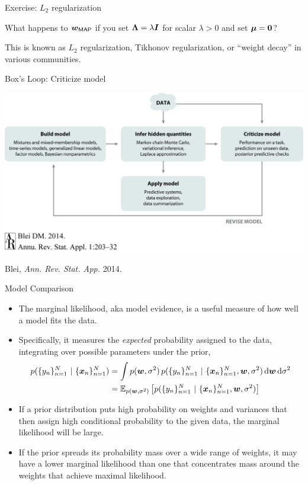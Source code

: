\documentclass[aspectratio=169]{beamer}
\begin{document}
\begin{frame}[t]{Exercise: $L_2$ regularization}

What happens to $\boldsymbol{w}_{\mathsf{MAP}}$ if you set $\boldsymbol{\Lambda} = \lambda \boldsymbol{I}$ for scalar $\lambda > 0$ and set $\boldsymbol{\mu} = \boldsymbol{0}$? 

This is known as $L_2$ regularization, Tikhonov regularization, or ``weight decay'' in various communities.

\end{frame}

\begin{frame}{Box's Loop: Criticize model}
\begin{center}
\includegraphics[width=.85\linewidth]{figures/lap1/boxsloop.jpeg}\\
\end{center} 
\begin{flushright}
{\footnotesize Blei, \textit{Ann. Rev. Stat. App.} 2014.}
\end{flushright}
\end{frame}

\begin{frame}{Model Comparison}

\begin{itemize}
\item The marginal likelihood, aka model evidence, is a useful measure of how well a model fits the data. 

\item Specifically, it measures the \emph{expected} probability assigned to the data, integrating over possible parameters under the prior,
\begin{align}
    p(\{y_n\}_{n=1}^N ~\vert~ \{\boldsymbol{x}_n\}_{n=1}^N) 
    &= \int p(\boldsymbol{w}, \sigma^2) \, p(\{y_n\}_{n=1}^N ~\vert~ \{\boldsymbol{x}_n\}_{n=1}^N, \boldsymbol{w}, \sigma^2) \mathop{}\!\mathrm{d}{\boldsymbol{w}} \mathop{}\!\mathrm{d}{\sigma^2} \\
    &= \mathbb{E}_{p(\boldsymbol{w}, \sigma^2)}\left[ p(\{y_n\}_{n=1}^N ~\vert~ \{\boldsymbol{x}_n\}_{n=1}^N, \boldsymbol{w}, \sigma^2) \right]
\end{align}

\item If a prior distribution puts high probability on weights and variances that then assign high conditional probability to the given data, the marginal likelihood will be large. 

\item If the prior spreads its probability mass over a wide range of weights, it may have a lower marginal likelihood than one that concentrates mass around the weights that achieve maximal likelihood. 
\end{itemize}

\end{frame}
\end{document}
